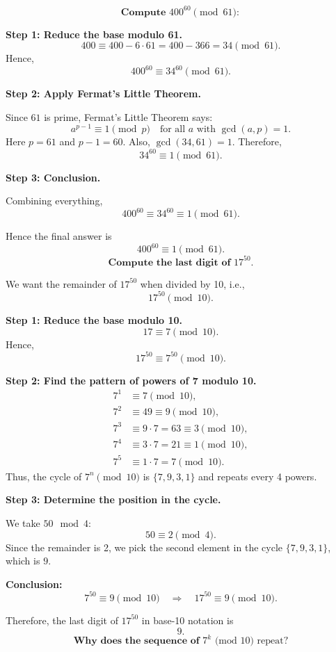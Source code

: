 \documentclass[12pt]{article}
\title{}
\author{Jerich Lee}
\date{\today}
\theoremstyle{definition} %
\theoremstyle{plain} %
\begin{document}
\maketitle
\[
\textbf{Compute } 400^{60} \pmod{61}:
\]

\textbf{Step 1: Reduce the base modulo 61.}  
\[
400 \equiv 400 - 6 \cdot 61 
     = 400 - 366
     = 34 
     \pmod{61}.
\]
Hence,
\[
400^{60} \equiv 34^{60} \pmod{61}.
\]

\textbf{Step 2: Apply Fermat's Little Theorem.}  

Since \(61\) is prime, Fermat's Little Theorem says:
\[
a^{p-1} \equiv 1 \pmod{p}
\quad
\text{for all } a \text{ with } \gcd(a, p) = 1.
\]
Here \(p = 61\) and \(p-1 = 60\). Also, \(\gcd(34, 61) = 1\). Therefore,
\[
34^{60} \equiv 1 \pmod{61}.
\]

\textbf{Step 3: Conclusion.}  

Combining everything,
\[
400^{60} 
\equiv 34^{60} 
\equiv 1
\pmod{61}.
\]

Hence the final answer is
\[
\boxed{400^{60} \equiv 1 \pmod{61}}.
\]
\[
\textbf{Compute the last digit of } 17^{50}.
\]

We want the remainder of \(17^{50}\) when divided by 10, i.e.,
\[
17^{50} \pmod{10}.
\]

\textbf{Step 1: Reduce the base modulo 10.}
\[
17 \equiv 7 \pmod{10}.
\]
Hence,
\[
17^{50} \equiv 7^{50} \pmod{10}.
\]

\textbf{Step 2: Find the pattern of powers of 7 modulo 10.}
\[
\begin{aligned}
7^1 &\equiv 7 \pmod{10},\\
7^2 &\equiv 49 \equiv 9 \pmod{10},\\
7^3 &\equiv 9 \cdot 7 = 63 \equiv 3 \pmod{10},\\
7^4 &\equiv 3 \cdot 7 = 21 \equiv 1 \pmod{10},\\
7^5 &\equiv 1 \cdot 7 = 7 \pmod{10}.
\end{aligned}
\]
Thus, the cycle of \(7^n \pmod{10}\) is \(\{7,9,3,1\}\) and repeats every 4 powers.

\textbf{Step 3: Determine the position in the cycle.}

We take \(50 \mod 4\):
\[
50 \equiv 2 \pmod{4}.
\]
Since the remainder is 2, we pick the second element in the cycle \(\{7,9,3,1\}\), which is \(9\).

\textbf{Conclusion:}
\[
7^{50} \equiv 9 \pmod{10} 
\quad\Longrightarrow\quad
17^{50} \equiv 9 \pmod{10}.
\]

Therefore, the last digit of \(17^{50}\) in base-10 notation is
\[
\boxed{9}.
\]
\[
\textbf{Why does the sequence of } 7^k \text{ (mod 10) repeat?}
\]
\end{document}
